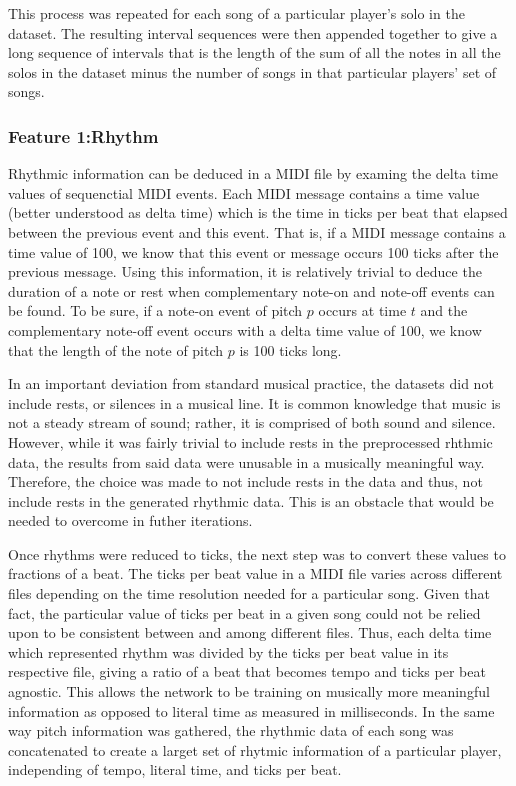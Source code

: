 \documentclass[conference]{IEEEtran}
\begin{document}
This process was repeated for each song of a particular player's solo in the dataset. The resulting interval sequences were then appended together to give a long sequence of intervals that is the length of the sum of all the notes in all the solos in the dataset minus the number of songs in that particular players' set of songs.

\subsubsection{Feature 1:Rhythm} \label{f2rhythm}
Rhythmic information can be deduced in a MIDI file by examing the delta time values of sequenctial MIDI events. Each MIDI message contains a time value (better understood as delta time) which is the time in ticks per beat that elapsed between the previous event and this event. That is, if a MIDI message contains a time value of 100, we know that this event or message occurs 100 ticks after the previous message. Using this information, it is relatively trivial to deduce the duration of a note or rest when complementary note-on and note-off events can be found. To be sure, if a note-on event of pitch $p$ occurs at time $t$ and the complementary note-off event occurs with a delta time value of 100, we know that the length of the note of pitch $p$ is 100 ticks long.

In an important deviation from standard musical practice, the datasets did not include rests, or silences in a musical line. It is common knowledge that music is not a steady stream of sound; rather, it is comprised of both sound and silence. However, while it was fairly trivial to include rests in the preprocessed rhthmic data, the results from said data were unusable in a musically meaningful way. Therefore, the choice was made to not include rests in the data and thus, not include rests in the generated rhythmic data. This is an obstacle that would be needed to overcome in futher iterations.

Once rhythms were reduced to ticks, the next step was to convert these values to fractions of a beat. The ticks per beat value in a MIDI file varies across different files depending on the time resolution needed for a particular song. Given that fact, the particular value of ticks per beat in a given song could not be relied upon to be consistent between and among different files. Thus, each delta time which represented rhythm was divided by the ticks per beat value in its respective file, giving a ratio of a beat that becomes tempo and ticks per beat agnostic. This allows the network to be training on musically more meaningful information as opposed to literal time as measured in milliseconds. In the same way pitch information was gathered, the rhythmic data of each song was concatenated to create a larget set of rhytmic information of a particular player, independing of tempo, literal time, and ticks per beat.
\end{document}
